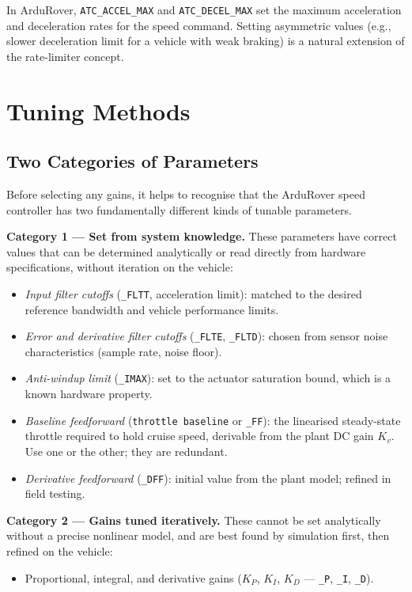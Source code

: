 \documentclass[../../book.tex]{subfiles}
\begin{document}
In ArduRover, \texttt{ATC\_ACCEL\_MAX} and \texttt{ATC\_DECEL\_MAX} set the
maximum acceleration and deceleration rates for the speed command.  Setting
asymmetric values (e.g., slower deceleration limit for a vehicle with weak
braking) is a natural extension of the rate-limiter concept.


\section{Tuning Methods}
\label{sec:tuning}

\subsection{Two Categories of Parameters}
\label{sec:two_categories}

Before selecting any gains, it helps to recognise that the ArduRover speed
controller has two fundamentally different kinds of tunable parameters.

\textbf{Category 1 — Set from system knowledge.}  These parameters have
correct values that can be determined analytically or read directly from
hardware specifications, without iteration on the vehicle:
\begin{itemize}
  \item \emph{Input filter cutoffs} (\texttt{\_FLTT}, acceleration limit):
    matched to the desired reference bandwidth and vehicle performance limits.
  \item \emph{Error and derivative filter cutoffs} (\texttt{\_FLTE},
    \texttt{\_FLTD}): chosen from sensor noise characteristics (sample rate,
    noise floor).
  \item \emph{Anti-windup limit} (\texttt{\_IMAX}): set to the actuator
    saturation bound, which is a known hardware property.
  \item \emph{Baseline feedforward} (\texttt{throttle baseline} or
    \texttt{\_FF}): the linearised steady-state throttle required to hold
    cruise speed, derivable from the plant DC gain $K_v$.  Use one or the
    other; they are redundant.
  \item \emph{Derivative feedforward} (\texttt{\_DFF}): initial value
    from the plant model; refined in field testing.
\end{itemize}

\textbf{Category 2 — Gains tuned iteratively.}  These cannot be set
analytically without a precise nonlinear model, and are best found by
simulation first, then refined on the vehicle:
\begin{itemize}
  \item Proportional, integral, and derivative gains
    ($K_P$, $K_I$, $K_D$ — \texttt{\_P}, \texttt{\_I}, \texttt{\_D}).
\end{itemize}
\end{document}
